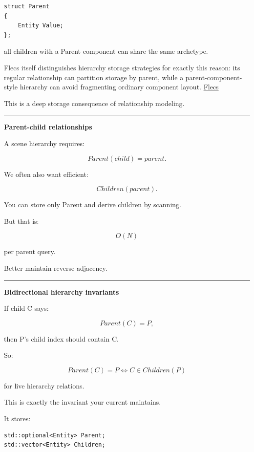 \begin{verbatim}
struct Parent
{
    Entity Value;
};
\end{verbatim}

all children with a Parent component can share the same archetype.

Flecs itself distinguishes hierarchy storage strategies for exactly this reason: its regular  relationship can partition storage by parent, while a parent-component-style hierarchy can avoid fragmenting ordinary component layout. \href{https://www.flecs.dev/flecs/HierarchiesManual.html?utm_source=chatgpt.com}{Flecs}

This is a deep storage consequence of relationship modeling.

\begin{center}\rule{0.5\linewidth}{0.5pt}\end{center}

\textbf{Parent-child relationships}

A scene hierarchy requires:

\[
Parent(child)=parent.
\]

We often also want efficient:

\[
Children(parent).
\]

You can store only Parent and derive children by scanning.

But that is:

\[
O(N)
\]

per parent query.

Better maintain reverse adjacency.

\begin{center}\rule{0.5\linewidth}{0.5pt}\end{center}

\textbf{Bidirectional hierarchy invariants}

If child C says:

\[
Parent(C)=P,
\]

then P's child index should contain C.

So:

\[
\boxed{
Parent(C)=P
\iff
C\in Children(P)
}
\]

for live hierarchy relations.

This is exactly the invariant your current  maintains.

It stores:

\begin{verbatim}
std::optional<Entity> Parent;
std::vector<Entity> Children;
\end{verbatim}

